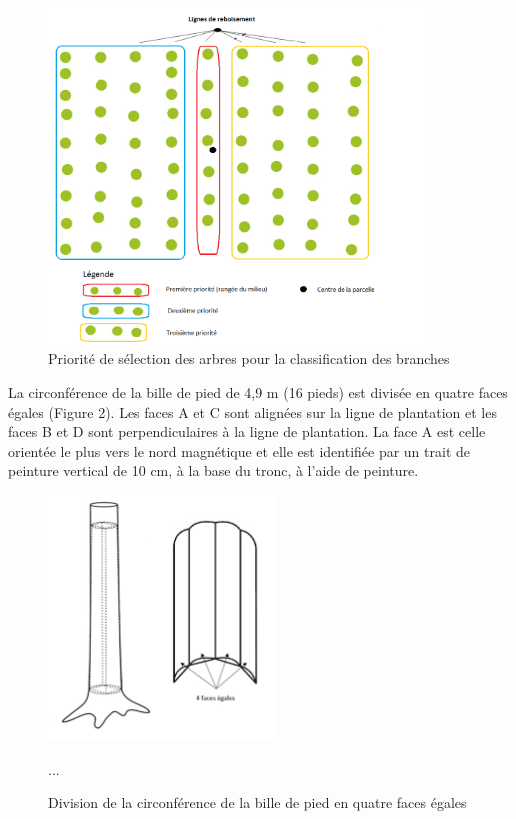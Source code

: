 \documentclass[letterpaper, 12pt]{article}
\begin{document}
\begin{onehalfspace}
\vspace{12pt}

\begin{figure}
	\centering
	\includegraphics[width=10cm]{Figure1}
	\caption{Priorité de sélection des arbres pour la classification des branches}
\end{figure}

La circonférence de la bille de pied de 4,9 m (16 pieds) est divisée en quatre faces égales (Figure 2). Les faces A et C sont alignées sur la ligne de plantation et les faces B et D sont perpendiculaires à la ligne de plantation. La face A est celle orientée le plus vers le nord magnétique et elle est identifiée par un trait de peinture vertical de 10 cm, à la base du tronc, à l’aide de peinture.

\vspace{12pt}

\begin{figure}[H]
	\centering
	\includegraphics[width=6cm]{Figure2}
	\caption{Division de la circonférence de la bille de pied en quatre faces égales}...
\end{figure}


\end{onehalfspace}
\end{document}
